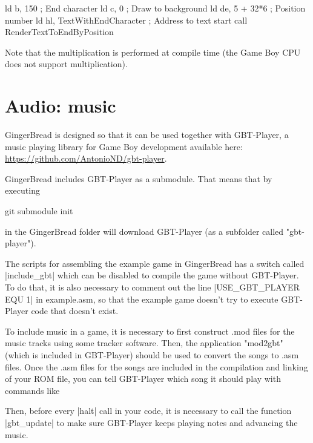 \documentclass[11pt]{book}
\begin{document}
\begin{code}
ld b, 150 ; End character
ld c, 0 ; Draw to background
ld de, 5 + 32*6 ; Position number
ld hl, TextWithEndCharacter ; Address to text start
call RenderTextToEndByPosition
\end{code}

Note that the multiplication is performed at compile time (the Game Boy CPU does not support multiplication).


\section{Audio: music}
\label{music}
GingerBread is designed so that it can be used together with GBT-Player, a music playing library for Game Boy development available here: \url{https://github.com/AntonioND/gbt-player}.

GingerBread includes GBT-Player as a submodule. That means that by executing

\begin{code} 
git submodule init
\end{code}

in the GingerBread folder will download GBT-Player (as a subfolder called "gbt-player"). 

The scripts for assembling the example game in GingerBread has a switch called |include_gbt| which can be disabled to compile the game without GBT-Player. To do that, it is also necessary to comment out the line |USE_GBT_PLAYER EQU 1| in example.asm, so that the example game doesn't try to execute GBT-Player code that doesn't exist.

To include music in a game, it is necessary to first construct .mod files for the music tracks using some tracker software. Then, the application "mod2gbt" (which is included in GBT-Player) should be used to convert the songs to .asm files. Once the .asm files for the songs are included in the compilation and linking of your ROM file,  you can tell GBT-Player which song it should play with commands like


Then, before every |halt| call in your code, it is necessary to call the function |gbt_update| to make sure GBT-Player keeps playing notes and advancing the music.
\end{document}
